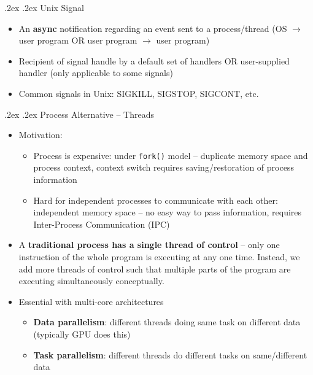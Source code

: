 \documentclass[13pt,landscape,a4paper]{article}
\makeatletter
\renewcommand{\section}{\@startsection{section}{1}{0mm}%
    {.2ex}%
    {.2ex}%
    {\color{myblue}\sffamily\small\bfseries}}
\renewcommand{\subsection}{\@startsection{subsection}{1}{0mm}%
    {.2ex}%
    {.2ex}%
    {\sffamily\bfseries}}
\makeatother
\begin{document}
\begin{multicols*}{3}
        \subsection{Unix Signal}
        \begin{itemize}
            \item An \textbf{async} notification regarding an event sent to a process/thread (OS $\rightarrow$ user program OR user program $\rightarrow$ user program)
            \item Recipient of signal handle by a default set of handlers OR user-supplied handler (only applicable to some signals)
            \item Common signals in Unix: SIGKILL, SIGSTOP, SIGCONT, etc.
        \end{itemize}
        \section{Process Alternative -- Threads}
        \begin{itemize}
            \item Motivation:
            \begin{itemize}
                \item Process is expensive: under \texttt{fork()} model -- duplicate memory space and process context, context switch requires saving/restoration of process information
                \item Hard for independent processes to communicate with each other: independent memory space -- no easy way to pass information, requires Inter-Process Communication (IPC)
            \end{itemize}
            \item A \textbf{traditional process has a single thread of control} -- only one instruction of the whole program is executing at any one time. Instead, we add more threads of control such that multiple parts of the program are executing simultaneously conceptually.
            \item Essential with multi-core architectures
            \begin{itemize}
                \item \textbf{Data parallelism}: different threads doing same task on different data (typically GPU does this)
                \item \textbf{Task parallelism}: different threads do different tasks on same/different data
            \end{itemize}
        \end{itemize}

\end{multicols*}
\end{document}
